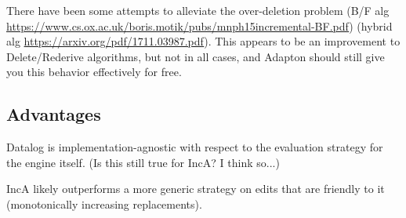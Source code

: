\documentclass[acmlarge,anonymous]{acmart}\settopmatter{printfolios=true}
\begin{document}
 There have been some attempts to alleviate the over-deletion problem (B/F alg \url{https://www.cs.ox.ac.uk/boris.motik/pubs/mnph15incremental-BF.pdf}) (hybrid alg \url{https://arxiv.org/pdf/1711.03987.pdf}). This appears to be an improvement to Delete/Rederive algorithms, but not in all cases, and Adapton should still give you this behavior effectively for free.\\

\subsection{Advantages}

Datalog is implementation-agnostic with respect to the evaluation strategy for the engine itself. (Is this still true for IncA? I think so...)

IncA likely outperforms a more generic strategy on edits that are friendly to it (monotonically increasing replacements).
\end{document}
